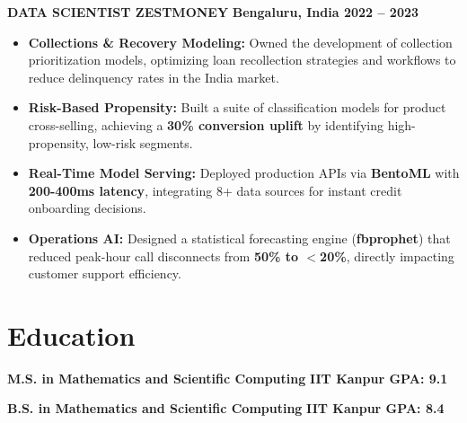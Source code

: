 \documentclass[10pt, letterpaper]{article}
\begin{document}
\noindent
\textbf{DATA SCIENTIST \textbar{} ZESTMONEY} \hfill \textbf{Bengaluru, India \textbar{} 2022 -- 2023}
\begin{itemize}[leftmargin=0.25in, itemsep=1pt]
    \item \textbf{Collections \& Recovery Modeling:} Owned the development of collection prioritization models, optimizing loan recollection strategies and workflows to reduce delinquency rates in the India market.
    \item \textbf{Risk-Based Propensity:} Built a suite of classification models for product cross-selling, achieving a \textbf{30\% conversion uplift} by identifying high-propensity, low-risk segments.
    \item \textbf{Real-Time Model Serving:} Deployed production APIs via \textbf{BentoML} with \textbf{200-400ms latency}, integrating 8+ data sources for instant credit onboarding decisions.
    \item \textbf{Operations AI:} Designed a statistical forecasting engine (\textbf{fbprophet}) that reduced peak-hour call disconnects from \textbf{50\% to $<$20\%}, directly impacting customer support efficiency.
\end{itemize}

\section*{Education}

\noindent
\textbf{M.S. in Mathematics and Scientific Computing} \hfill \textbf{IIT Kanpur \textbar{} GPA: 9.1}
\vspace{1ex}

\noindent
\textbf{B.S. in Mathematics and Scientific Computing} \hfill \textbf{IIT Kanpur \textbar{} GPA: 8.4}
\end{document}
